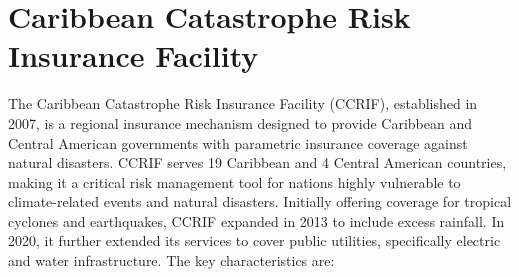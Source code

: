 \documentclass[fleqn,mnsc,nonblindrev]{informs4}
\begin{document}
\section{Caribbean Catastrophe Risk Insurance Facility}\label{app:ccrif}
The Caribbean Catastrophe Risk Insurance Facility (CCRIF), established in 2007, is a regional insurance mechanism designed to provide Caribbean and Central American governments with parametric insurance coverage against natural disasters. CCRIF serves 19 Caribbean and 4 Central American countries, making it a critical risk management tool for nations highly vulnerable to climate-related events and natural disasters. Initially offering coverage for tropical cyclones and earthquakes, CCRIF expanded in 2013 to include excess rainfall. In 2020, it further extended its services to cover public utilities, specifically electric and water infrastructure. The key characteristics are:
\end{document}
